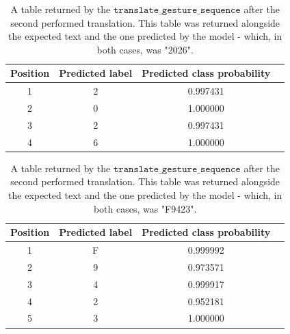 \documentclass{article}
\newcommand{\code}[1]{\texttt{#1}} %
\begin{document}
\begin{center}
  \begin{table}[ht]
    \begin{tabular}{|c |c |c |c|}
      \hline
      Position & Predicted label & Predicted class probability \\
      \hline
      1 & 2 & 0.997431 \\
      2 & 0 & 1.000000 \\
      3 & 2 & 0.997431 \\
      4 & 6 & 1.000000 \\
      \hline
    \end{tabular}
    \caption{A table returned by the $\code{translate\_gesture\_sequence}$ after the second performed translation. This table was returned alongside
    the expected text and the one predicted by the model - which, in both cases, was "2026".}
    \label{table:3}
  \end{table}
\end{center}

\begin{center}
  \begin{table}[ht]
    \begin{tabular}{|c |c |c |c|}
      \hline
      Position & Predicted label & Predicted class probability \\
      \hline
      1 & F & 0.999992 \\
      2 & 9 & 0.973571 \\
      3 & 4 & 0.999917 \\
      4 & 2 & 0.952181 \\
      5 & 3 & 1.000000 \\
      \hline
    \end{tabular}
    \caption{A table returned by the $\code{translate\_gesture\_sequence}$ after the second performed translation. This table was returned alongside
    the expected text and the one predicted by the model - which, in both cases, was "F9423".}
    \label{table:4}
  \end{table}
\end{center}

\clearpage
\renewcommand{\refname}{Sources}


\end{document}
